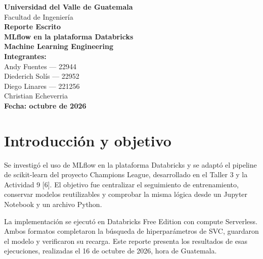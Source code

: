 \documentclass[12pt,a4paper]{article}
\begin{document}

\hypersetup{pageanchor=false}

\begin{titlepage}
    \centering
    \vspace*{2cm}

    {\LARGE\textbf{Universidad del Valle de Guatemala}}\\[0.5cm]
    {\Large Facultad de Ingeniería}\\[1.5cm]

    {\Huge\textbf{Reporte Escrito}}\\[0.5cm]
    {\Large\textbf{MLflow en la plataforma Databricks}}\\[0.4cm]
    {\Large\textbf{Machine Learning Engineering}}\\[2cm]

    \textbf{Integrantes:}\\[0.3cm]
    Andy Fuentes --- 22944\\
    Diederich Solís --- 22952\\
    Diego Linares --- 221256\\
    Christian Echeverria\\[2cm]

    \textbf{Fecha: octubre de 2026}

    \vfill
\end{titlepage}

\hypersetup{pageanchor=true}



\section{Introducción y objetivo}
Se investigó el uso de MLflow en la plataforma Databricks y se adaptó el pipeline de scikit-learn del proyecto Champions League, desarrollado en el Taller 3 y la Actividad 9 [6]. El objetivo fue centralizar el seguimiento de entrenamiento, conservar modelos reutilizables y comprobar la misma lógica desde un Jupyter Notebook y un archivo Python.

La implementación se ejecutó en Databricks Free Edition con compute Serverless. Ambos formatos completaron la búsqueda de hiperparámetros de SVC, guardaron el modelo y verificaron su recarga. Este reporte presenta los resultados de esas ejecuciones, realizadas el 16 de octubre de 2026, hora de Guatemala.
\end{document}
